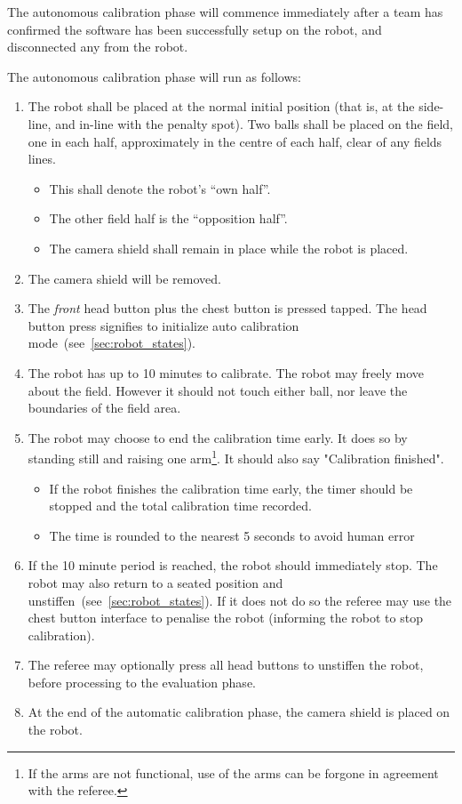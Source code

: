 The autonomous calibration phase will commence immediately after a team has confirmed the software has been successfully setup on the robot, and disconnected any from the robot.

The autonomous calibration phase will run as follows:
\begin{enumerate}
    \item The robot shall be placed at the normal initial position (that is, at the side-line, and in-line with the penalty spot). Two balls shall be placed on the field, one in each half, approximately in the centre of each half, clear of any fields lines.
    \begin{itemize}
        \item This shall denote the robot's  ``own half''.
        \item The other field half is the ``opposition half''.
        \item The camera shield shall remain in place while the robot is placed.
    \end{itemize} 
    \item The camera shield will be removed.
    \item The \textit{front} head button plus the chest button is pressed tapped. The head button press signifies to initialize auto calibration mode~(see~\ref{sec:robot_states}).
    \item The robot has up to 10 minutes to calibrate. The robot may freely move about the field. However it should not touch either ball, nor leave the boundaries of the field area.
    \item The robot may choose to end the calibration time early. It does so by standing still and raising one arm\footnote{If the arms are not functional, use of the arms can be forgone in agreement with the referee.}. It should also say "Calibration finished".
    \begin{itemize}
        \item If the robot finishes the calibration time early, the timer should be stopped and the total calibration time recorded.
        \item The time is rounded to the nearest 5 seconds to avoid human error
    \end{itemize} 
    \item If the 10 minute period is reached, the robot should immediately stop. The robot may also return to a seated position and unstiffen~(see~\ref{sec:robot_states}). If it does not do so the referee may use the chest button interface to penalise the robot (informing the robot to stop calibration). 
    \item The referee may optionally press all head buttons to unstiffen the robot, before processing to the evaluation phase.
    \item At the end of the automatic calibration phase, the camera shield is placed on the robot.
\end{enumerate} 

